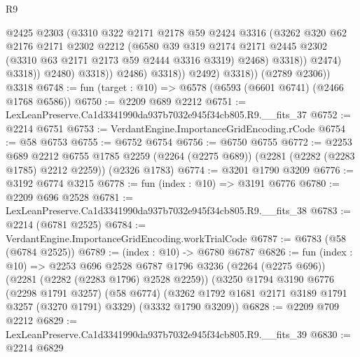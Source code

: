 \begin{lexlean}{R9}
\begin{coremodule}
                              @2425
                              @2303
                              (@3310
                                @322
                                @2171
                                @2178
                                @59
                                @2424
                                @3316
                                (@3262
                                  @320
                                  @62
                                  @2176
                                  @2171
                                  @2302
                                  @2212
                                  (@6580
                                    @39
                                    @319
                                    @2174
                                    @2171
                                    @2445
                                    @2302
                                    (@3310 @63 @2171 @2173 @59 @2444 @3316 @3319)
                                    @2468)
                                  @3318))
                              @2474)
                            @3318))
                        @2480)
                      @3318))
                  @2486)
                @3318))
            @2492)
          @3318))
      (@2789 @2306))
    @3318
@6748 := fun (target : @10) => @6578 (@6593 (@6601 @6741) (@2466 @1768 @6586))
@6750 := @2209 @689 @2212
@6751 := LexLeanPreserve.Ca1d3341990da937b7032e945f34cb805.R9.__fits_37
@6752 := @2214 @6751
@6753 := VerdantEngine.ImportanceGridEncoding.rCode
@6754 := @58 @6753
@6755 := @6752 @6754
@6756 := @6750 @6755
@6772 := @2253
    @689
    @2212
    @6755
    @1785
    @2259
    (@2264 (@2275 @689))
    (@2281 (@2282 (@2283 @1785) @2212 @2259))
    (@2326 @1783)
@6774 := @3201 @1790 @3209
@6776 := @3192 @6774 @3215
@6778 := fun (index : @10) => @3191 @6776
@6780 := @2209 @696 @2528
@6781 := LexLeanPreserve.Ca1d3341990da937b7032e945f34cb805.R9.__fits_38
@6783 := @2214 (@6781 @2525)
@6784 := VerdantEngine.ImportanceGridEncoding.workTrialCode
@6787 := @6783 (@58 (@6784 @2525))
@6789 := (index : @10) -> @6780 @6787
@6826 := fun (index : @10) =>
  @2253
    @696
    @2528
    @6787
    @1796
    @3236
    (@2264 (@2275 @696))
    (@2281 (@2282 (@2283 @1796) @2528 @2259))
    (@3250
      @1794
      @3190
      @6776
      (@2298 @1791 @3257)
      (@58 @6774)
      (@3262 @1792 @1681 @2171 @3189 @1791 @3257 (@3270 @1791) @3329)
      (@3332 @1790 @3209))
@6828 := @2209 @709 @2212
@6829 := LexLeanPreserve.Ca1d3341990da937b7032e945f34cb805.R9.__fits_39
@6830 := @2214 @6829

\end{coremodule}
\end{lexlean}
